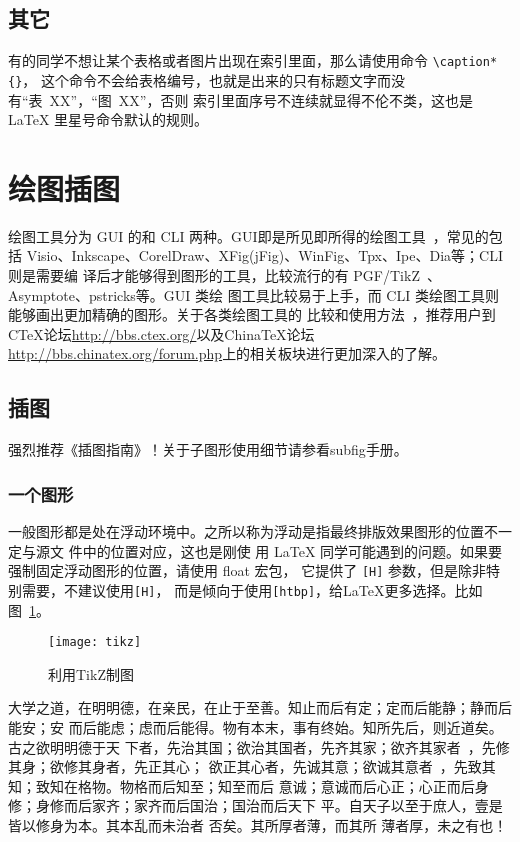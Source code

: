 \subsection{其它}
\label{sec:tableother}
有的同学不想让某个表格或者图片出现在索引里面，那么请使用命令 \verb|\caption*{}|，
这个命令不会给表格编号，也就是出来的只有标题文字而没有“表~XX”，“图~XX”，否则
索引里面序号不连续就显得不伦不类，这也是 \LaTeX{} 里星号命令默认的规则。

\section{绘图插图}

绘图工具分为 GUI 的和 CLI 两种。GUI即是所见即所得的绘图工具~，常见的包
括 Visio、Inkscape、CorelDraw、XFig(jFig)、WinFig、Tpx、Ipe、Dia等；CLI则是需要编
译后才能够得到图形的工具，比较流行的有 PGF/TikZ~、Asymptote、pstricks等。GUI 类绘
图工具比较易于上手，而 CLI 类绘图工具则能够画出更加精确的图形。关于各类绘图工具的
比较和使用方法~，推荐用户到C\TeX{}论坛{\url{http://bbs.ctex.org/}}以及China\TeX{}论坛
{\url{http://bbs.chinatex.org/forum.php}}上的相关板块进行更加深入的了解。

\subsection{插图}
\label{sec:graphs}

强烈推荐《\LaTeXe 插图指南》！关于子图形使用细节请参看\textsf{subfig}手册。 

\subsubsection{一个图形}
\label{sec:onefig}
一般图形都是处在浮动环境中。之所以称为浮动是指最终排版效果图形的位置不一定与源文
件中的位置对应，这也是刚使
用 \LaTeX{} 同学可能遇到的问题。如果要强制固定浮动图形的位置，请使用 \textsf{float} 宏包，
它提供了 \texttt{[H]} 参数，但是除非特别需要，不建议使用\texttt{[H]}，
而是倾向于使用\texttt{[htbp]}，给\LaTeX{}更多选择。比如图~\ref{fig:ipe}。
\begin{figure}[htbp] %
  \centering
  \texttt{[image: tikz]}
  \caption{利用TikZ制图}
  \label{fig:ipe}
\end{figure}

大学之道，在明明德，在亲民，在止于至善。知止而后有定；定而后能静；静而后能安；安
而后能虑；虑而后能得。物有本末，事有终始。知所先后，则近道矣。古之欲明明德于天
下者，先治其国；欲治其国者，先齐其家；欲齐其家者~，先修其身；欲修其身者，先正其心；
欲正其心者，先诚其意；欲诚其意者~，先致其知；致知在格物。物格而后知至；知至而后
意诚；意诚而后心正；心正而后身修；身修而后家齐；家齐而后国治；国治而后天下
平。自天子以至于庶人，壹是皆以修身为本。其本乱而未治者 否矣。其所厚者薄，而其所
薄者厚，未之有也！

